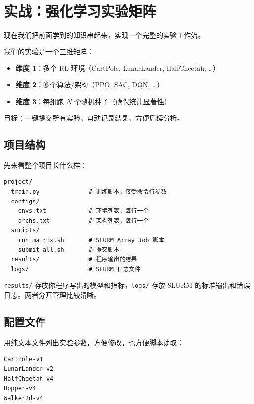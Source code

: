 \section{实战：强化学习实验矩阵}

现在我们把前面学到的知识串起来，实现一个完整的实验工作流。

我们的实验是一个三维矩阵：

\begin{itemize}[nosep]
  \item \textbf{维度 1}：多个 RL 环境（CartPole, LunarLander, HalfCheetah, \ldots）
  \item \textbf{维度 2}：多个算法/架构（PPO, SAC, DQN, \ldots）
  \item \textbf{维度 3}：每组跑 $N$ 个随机种子（确保统计显著性）
\end{itemize}

目标：一键提交所有实验，自动记录结果，方便后续分析。

\subsection{项目结构}

先来看整个项目长什么样：

\begin{lstlisting}
project/
  train.py              # 训练脚本，接受命令行参数
  configs/
    envs.txt            # 环境列表，每行一个
    archs.txt           # 架构列表，每行一个
  scripts/
    run_matrix.sh       # SLURM Array Job 脚本
    submit_all.sh       # 提交脚本
  results/              # 程序输出的结果
  logs/                 # SLURM 日志文件
\end{lstlisting}

\texttt{results/} 存放你程序写出的模型和指标，\texttt{logs/} 存放 SLURM 的标准输出和错误日志。两者分开管理比较清晰。

\subsection{配置文件}

用纯文本文件列出实验参数，方便修改，也方便脚本读取：

\begin{lstlisting}[title={\texttt{configs/envs.txt}}]
CartPole-v1
LunarLander-v2
HalfCheetah-v4
Hopper-v4
Walker2d-v4
\end{lstlisting}

